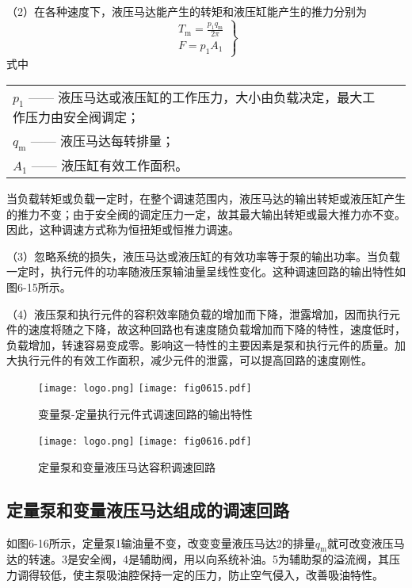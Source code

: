 （2）在各种速度下，液压马达能产生的转矩和液压缸能产生的推力分别为
\begin{equation}
\left.
\begin{aligned}
T_\text{m}=\frac{p_\text{1}q_\text{m}}{2\pi}\\
F=p_1A_1
\end{aligned}
\right\}
\end{equation}
\noindent 式中\  
\begin{tabular}[t]{ll}
$p_\text{1}$ ——\hspace{1mm} 液压马达或液压缸的工作压力，大小由负载决定，最大工作压力由安全阀调定；\\
$q_\text{m}$ ——\hspace{1mm} 液压马达每转排量；\\
$A_\text{1}$ ——\hspace{1mm} 液压缸有效工作面积。
\end{tabular}

当负载转矩或负载一定时，在整个调速范围内，液压马达的输出转矩或液压缸产生的推力不变；由于安全阀的调定压力一定，故其最大输出转矩或最大推力亦不变。因此，这种调速方式称为恒扭矩或恒推力调速。

（3）忽略系统的损失，液压马达或液压缸的有效功率等于泵的输出功率。当负载一定时，执行元件的功率随液压泵输油量呈线性变化。这种调速回路的输出特性如图6-15所示。

（4）液压泵和执行元件的容积效率随负载的增加而下降，泄露增加，因而执行元件的速度将随之下降，故这种回路也有速度随负载增加而下降的特性，速度低时，负载增加，转速容易变成零。影响这一特性的主要因素是泵和执行元件的质量。加大执行元件的有效工作面积，减少元件的泄露，可以提高回路的速度刚性。
\begin{figure}\centering
\ifOpenSource
\texttt{[image: logo.png]}
\else
\texttt{[image: fig0615.pdf]}
\fi
\caption{变量泵-定量执行元件式调速回路的输出特性}
\label{fig:fig0615}
\end{figure}
\begin{figure}\centering
\ifOpenSource
\texttt{[image: logo.png]}
\else
\texttt{[image: fig0616.pdf]}
\fi
\caption{定量泵和变量液压马达容积调速回路}
\label{fig:fig0616}
\end{figure}
\subsection{定量泵和变量液压马达组成的调速回路}
如图6-16所示，定量泵1输油量不变，改变变量液压马达2的排量$q_\text{m}$就可改变液压马达的转速。3是安全阀，4是辅助阀，用以向系统补油。5为辅助泵的溢流阀，其压力调得较低，使主泵吸油腔保持一定的压力，防止空气侵入，改善吸油特性。


